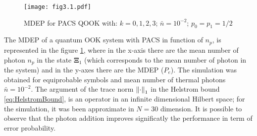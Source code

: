     \begin{figure}[ht]
        \begin{center}
            \texttt{[image: fig3.1.pdf]}
            \caption{MDEP for PACS QOOK with: $k=0,1,2,3$; $\bar{n}=10^{-2}$; $p_0=p_1=1/2$}
            \label{fig:3.1}
        \end{center}
    \end{figure}
    The MDEP of a quantum OOK system with PACS in function of $n_p$, is represented in the figure
    \ref{fig:3.1}, where in the x-axis there are the mean number of photon $n_p$ in the state 
    $\pmb{\Xi}_1$ (which corresponds to the mean number of photon in the system) and in the 
    y-axes there are the MDEP ($P_e$). The simulation was obtained for equiprobable symbols and 
    mean number of thermal photons $\bar{n}=10^{-2}$.  
    The argument of the trace norm $\norm{\cdot}_1$ in the Helstrom bound 
    \ref{eq:HelstromBound}, is an operator in an infinite dimensional Hilbert space; for the 
    simulation, it was been approximate in $N=30$ dimension.
    It is possible to observe that the photon addition improves significatly the performance in term
    of error probability.

